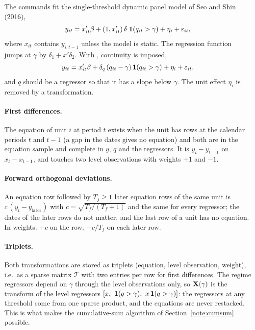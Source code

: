 The commands fit the single-threshold dynamic panel model of Seo and Shin (2016),
\begin{equation}\label{eq:jump}
y_{it}=x_{it}'\beta+(1,x_{it}')\,\delta\;\mathbf{1}(q_{it}>\gamma)+\eta_i+\varepsilon_{it},
\end{equation}
where $x_{it}$ contains $y_{i,t-1}$ unless the model is static. The regression function jumps at
$\gamma$ by $\delta_1+x'\delta_2$. With , continuity is imposed,
\begin{equation}\label{eq:kink}
y_{it}=x_{it}'\beta+\delta_q\,(q_{it}-\gamma)\,\mathbf{1}(q_{it}>\gamma)+\eta_i+\varepsilon_{it},
\end{equation}
and $q$ should be a regressor so that it has a slope below $\gamma$. The unit effect $\eta_i$ is
removed by a transformation.

\paragraph{First differences.} The equation of unit $i$ at period $t$ exists when the unit has rows
at the calendar periods $t$ and $t-1$ (a gap in the dates gives no equation) and both are in the
equation sample and complete in $y$, $q$ and the regressors. It is $y_t-y_{t-1}$ on
$x_t-x_{t-1}$, and touches two level observations with weights $+1$ and $-1$.

\paragraph{Forward orthogonal deviations.} An equation row followed by $T_f\ge1$ later equation rows of
the same unit is $c\,(y_t-\overline{y}_{\text{later}})$ with $c=\sqrt{T_f/(T_f+1)}$ and the same for
every regressor; the dates of the later rows do not matter, and the last row of a unit has no
equation. In weights: $+c$ on the row, $-c/T_f$ on each later row.

\paragraph{Triplets.} Both transformations are stored as triplets (equation, level observation,
weight), i.e.\ as a sparse matrix $\mathcal T$ with two entries per row for first differences. The
regime regressors depend on $\gamma$ through the level observations only, so $\mathbf{X}(\gamma)$ is the
transform of the level regressors $[x,\ \ind(q>\gamma),\ x\,\ind(q>\gamma)]$: the regressors at any
threshold come from one sparse product, and the equations are never restacked. This is what makes
the cumulative-sum algorithm of Section~\ref{note:cumsum} possible.

